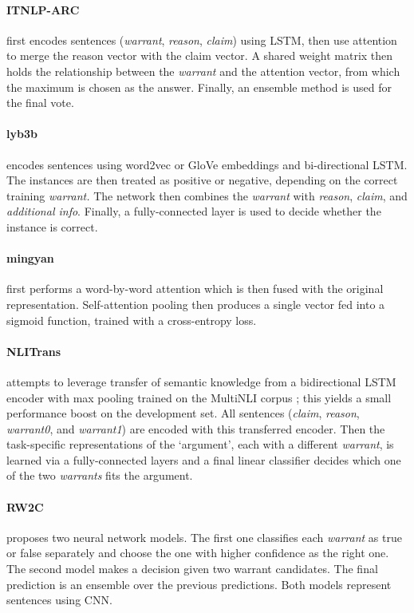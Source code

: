 \paragraph{ITNLP-ARC}
first encodes sentences (\emph{warrant}, \emph{reason}, \emph{claim}) using LSTM, then use attention to merge the reason vector with the claim vector. A shared weight matrix then holds the relationship between the \emph{warrant} and the attention vector, from which the maximum is chosen as the answer. Finally, an ensemble method is used for the final vote.


\paragraph{lyb3b}
encodes sentences using word2vec or GloVe embeddings and bi-directional LSTM. The instances are then treated as positive or negative, depending on the correct training \emph{warrant.} The network then combines the \emph{warrant} with \emph{reason}, \emph{claim}, and \emph{additional info}. Finally, a fully-connected layer is used to decide whether the instance is correct.


\paragraph{mingyan}
first performs a word-by-word attention which is then fused with the original representation. Self-attention pooling then produces a single vector fed into a sigmoid function, trained with a cross-entropy loss.


\paragraph{NLITrans} 
attempts to leverage transfer of semantic knowledge from a bidirectional LSTM encoder with max pooling trained on the MultiNLI corpus \cite{nangia-EtAl:2017:RepEval}; this yields a small performance boost on the development set. All sentences (\emph{claim}, \emph{reason}, \emph{warrant0}, and \emph{warrant1}) are encoded with this transferred encoder. Then the task-specific representations of the `argument', each with a different \emph{warrant}, is learned via a fully-connected layers and a final linear classifier decides which one of the two \emph{warrants} fits the argument.


\paragraph{RW2C}
proposes two neural network models. The first one classifies each \emph{warrant} as true or false separately and choose the one with higher confidence as the right one. The second model makes a decision given two warrant candidates. The final prediction is an ensemble over the previous predictions. Both models represent sentences using CNN.


